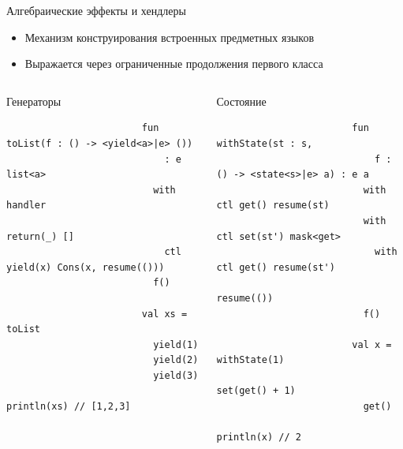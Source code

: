     \begin{frame}[fragile]{Алгебраические эффекты и хендлеры}
        \begin{itemize}
            \item Механизм конструирования встроенных предметных языков
            \item Выражается через ограниченные продолжения первого класса
        \end{itemize}
        \vspace{-1em}
        \begin{columns}[onlytextwidth]
            \begin{column}[t]{0.485\textwidth}
                \begin{block}{Генераторы}
                    \begin{verbatim}
                        fun toList(f : () -> <yield<a>|e> ())
                            : e list<a>
                          with handler
                            return(_) []
                            ctl yield(x) Cons(x, resume(()))
                          f()

                        val xs = toList
                          yield(1)
                          yield(2)
                          yield(3)
                        println(xs) // [1,2,3]
                    \end{verbatim}
                \end{block}
            \end{column}\hfill%
            \begin{column}[t]{0.485\textwidth}
                \begin{block}{Состояние}
                    \begin{verbatim}
                        fun withState(st : s,
                            f : () -> <state<s>|e> a) : e a
                          with ctl get() resume(st)
                          with ctl set(st') mask<get>
                            with ctl get() resume(st')
                            resume(())
                          f()

                        val x = withState(1)
                          set(get() + 1)
                          get()
                        println(x) // 2
                    \end{verbatim}
                \end{block}
            \end{column}
        \end{columns}
    \end{frame}

